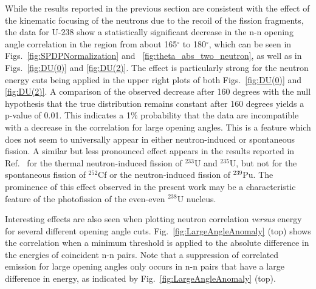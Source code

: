 \label{sec:anomaly}
While the results reported in the previous section are consistent with the effect of the kinematic focusing of the neutrons due to the recoil of the fission fragments, the data for U-238 show a statistically significant decrease in the n-n opening angle correlation in the region from about 165$^{\circ}$ to 180$^{\circ}$, which can be seen in Figs.~\ref{fig:SPDPNormalization} and ~\ref{fig:theta_abs_two_neutron}, as well as in Figs.~\ref{fig:DU(0)} and \ref{fig:DU(2)}.
The effect is particularly strong for the neutron energy cuts being applied in the upper right plots of both Figs.~\ref{fig:DU(0)} and \ref{fig:DU(2)}.
A comparison of the observed decrease after 160 degrees with the null hypothesis that the true distribution remains constant after 160 degrees yields a p-value of 0.01.
This indicates a 1\% probability that the data are incompatible with a decrease in the correlation for large opening angles.
This is a feature which does not seem to universally appear in either neutron-induced or spontaneous fission.
A similar but less pronounced effect appears in the results reported in Ref.~\cite{Sokolov2010} for the thermal neutron-induced fission of $^{233}$U and $^{235}$U, but not for the spontaneous fission of $^{252}$Cf or the neutron-induced fission of $^{239}$Pu.
The prominence of this effect observed in the present work may be a characteristic feature of the photofission of the even-even $^{238}$U nucleus.

Interesting effects are also seen when plotting neutron correlation \textit{versus} energy for several different opening angle cuts.
Fig.~\ref{fig:LargeAngleAnomaly} (top) shows the correlation when a minimum threshold is applied to the absolute difference in the energies of coincident n-n pairs. %
Note that a suppression of correlated emission for large opening angles only occurs in n-n pairs that have a large difference in energy, as indicated by Fig.~\ref{fig:LargeAngleAnomaly} (top).

